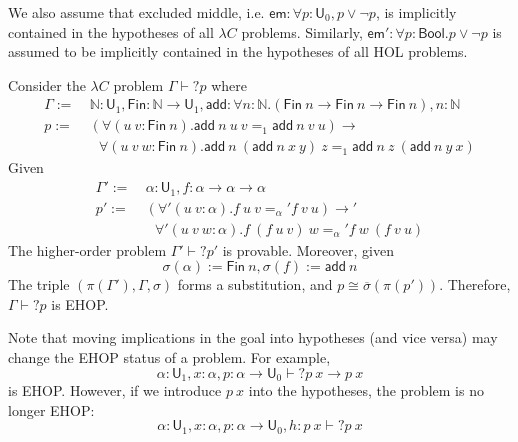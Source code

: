 \noindent We also assume that excluded middle, i.e. $\mathsf{em} : \forall p : \mathsf{U}_0, p \lor \neg p$,
is implicitly contained in the hypotheses of all $\lambda C$ problems. Similarly, $\mathsf{em}' : \forall p : \mathsf{Bool}. p \lor \neg p$
is assumed to be implicitly contained in the hypotheses of all HOL problems.

\begin{example} Consider the $\lambda C$ problem $\Gamma \vdash? p$ where
\begin{align*}
  \Gamma := \ & \mathbb{N} : \mathsf{U}_1, \mathsf{Fin} : \mathbb{N} \to \mathsf{U}_1,
  \mathsf{add} : \forall n : \mathbb{N}. (\mathsf{Fin} \ n \to \mathsf{Fin} \ n \to \mathsf{Fin} \ n), n : \mathbb{N} \\
  p := \ & (\forall (u \ v : \mathsf{Fin} \ n). \mathsf{add} \ n \ u \ v =_1 \mathsf{add} \ n \ v \ u) \to \\
  & \ \ \ \forall (u \ v \ w : \mathsf{Fin} \ n). \mathsf{add} \ n \ (\mathsf{add} \ n \ x \ y) \ z =_1 \mathsf{add} \ n \ z \ (\mathsf{add} \ n \ y \ x)
\end{align*}
Given
\begin{align*}
  \Gamma' := \ & \alpha : \mathsf{U}_1, f : \alpha \to \alpha \to \alpha \\
  p' := \ & (\forall' (u \ v : \alpha). f \ u \ v =_\alpha' f \ v \ u) \to' \\
  & \ \ \ \forall' (u \ v \ w : \alpha). f \ (f \ u \ v) \ w =_\alpha' f \ w \ (f \ v \ u)
\end{align*}
The higher-order problem $\Gamma' \vdash? p'$ is provable. Moreover, given
$$\sigma(\alpha) := \mathsf{Fin} \ n, \sigma(f) := \mathsf{add} \ n$$
The triple $(\pi(\Gamma'), \Gamma, \sigma)$ forms a substitution, and $p \cong \overline{\sigma}(\pi(p'))$.
Therefore, $\Gamma \vdash? p$ is EHOP.
\end{example}

\noindent Note that moving implications in the goal into hypotheses (and vice versa) may
change the EHOP status of a problem. For example,
$$\alpha : \mathsf{U}_1, x : \alpha, p : \alpha \to \mathsf{U}_0 \vdash? p \ x \to p \ x$$
is EHOP. However, if we introduce $p \ x$ into the hypotheses, the problem is no longer EHOP:
\begin{equation}\label{hypnehop}
  \alpha : \mathsf{U}_1, x : \alpha, p : \alpha \to \mathsf{U}_0, h : p \ x \vdash? p \ x
\end{equation}

